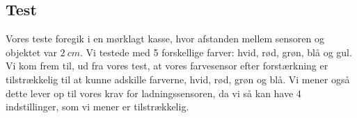 





\subsection{Test}
Vores teste foregik i en mørklagt kasse, hvor afstanden mellem sensoren og objektet var $\SI{2}{cm}$. Vi testede med 5 forskellige farver: hvid, rød, grøn, blå og gul. Vi kom frem til, ud fra vores test, at vores farvesensor efter forstærkning er tilstrækkelig til at kunne adskille farverne, hvid, rød, grøn og blå. Vi mener også dette lever op til vores krav for ladningssensoren, da vi så kan have 4 indstillinger, som vi mener er tilstrækkelig.


